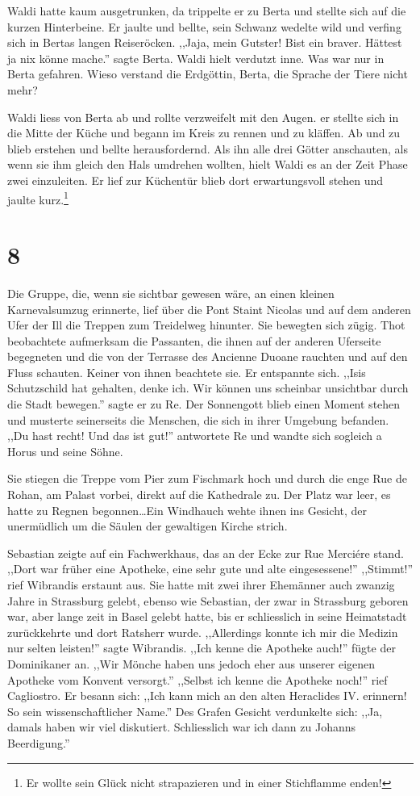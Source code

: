 Waldi hatte kaum ausgetrunken, da trippelte er zu Berta und stellte sich auf die kurzen Hinterbeine. Er jaulte und bellte, sein Schwanz wedelte wild und verfing sich in Bertas langen Reiseröcken. ,,Jaja, mein Gutster! Bist ein braver. Hättest ja nix könne mache.'' sagte Berta. Waldi hielt verdutzt inne. Was war nur in Berta gefahren. Wieso verstand die Erdgöttin, Berta, die Sprache der Tiere nicht mehr?

Waldi liess von Berta ab und rollte verzweifelt mit den Augen. er stellte sich in die Mitte der Küche und begann im Kreis zu rennen und zu kläffen. Ab und zu blieb erstehen und bellte herausfordernd. Als ihn alle drei Götter anschauten, als wenn sie ihm gleich den Hals umdrehen wollten, hielt Waldi es an der Zeit Phase zwei einzuleiten. Er lief zur Küchentür blieb dort erwartungsvoll stehen und jaulte kurz.\footnote{Er wollte sein Glück nicht strapazieren und in einer Stichflamme enden!}


\section*{8}

Die Gruppe, die, wenn sie sichtbar gewesen wäre, an einen kleinen Karnevalsumzug erinnerte, lief über die Pont Staint Nicolas und auf dem anderen Ufer der Ill die Treppen zum Treidelweg hinunter. Sie bewegten sich zügig. Thot beobachtete aufmerksam die Passanten, die ihnen auf der anderen Uferseite begegneten und die von der Terrasse des Ancienne Duoane rauchten und auf den Fluss schauten. Keiner von ihnen beachtete sie. Er entspannte sich. ,,Isis Schutzschild hat gehalten, denke ich. Wir können uns scheinbar unsichtbar durch die Stadt bewegen.'' sagte er zu Re. Der Sonnengott blieb einen Moment stehen und musterte seinerseits die Menschen, die sich in ihrer Umgebung befanden. ,,Du hast recht! Und das ist gut!'' antwortete Re und wandte sich sogleich a Horus und seine Söhne.

Sie stiegen die Treppe vom Pier zum Fischmark hoch und durch die enge Rue de Rohan, am Palast vorbei, direkt auf die Kathedrale zu. Der Platz war leer, es hatte zu Regnen begonnen\dots Ein Windhauch wehte ihnen ins Gesicht, der unermüdlich um die Säulen der gewaltigen Kirche strich.

Sebastian zeigte auf ein Fachwerkhaus, das an der Ecke zur Rue Merciére stand. ,,Dort war früher eine Apotheke, eine sehr gute und alte eingesessene!'' ,,Stimmt!'' rief Wibrandis erstaunt aus. Sie hatte mit zwei ihrer Ehemänner auch zwanzig Jahre in Strassburg gelebt, ebenso wie Sebastian, der zwar in Strassburg geboren war, aber lange zeit in Basel gelebt hatte, bis er schliesslich in seine Heimatstadt zurückkehrte und dort Ratsherr wurde. ,,Allerdings konnte ich mir die Medizin nur selten leisten!'' sagte Wibrandis. ,,Ich kenne die Apotheke auch!'' fügte der Dominikaner an. ,,Wir Mönche haben uns jedoch eher aus unserer eigenen Apotheke vom Konvent versorgt.'' ,,Selbst ich kenne die Apotheke noch!'' rief Cagliostro. Er besann sich: ,,Ich kann mich  an den alten Heraclides IV. erinnern! So sein wissenschaftlicher Name.'' Des Grafen Gesicht verdunkelte sich: ,,Ja, damals haben wir viel diskutiert. Schliesslich war ich dann zu Johanns Beerdigung.''

